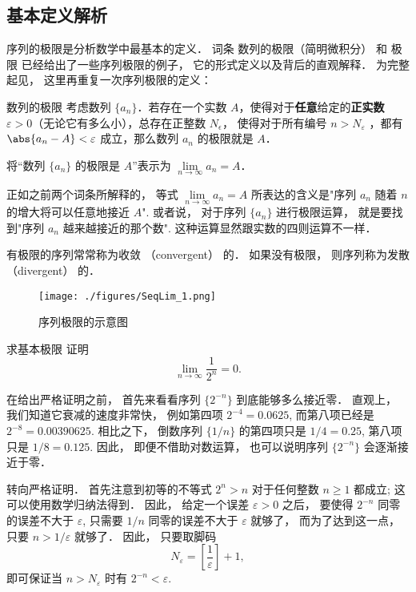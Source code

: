 

\subsection{基本定义解析}

序列的极限是分析数学中最基本的定义． 词条 数列的极限（简明微积分） 和 极限 已经给出了一些序列极限的例子， 它的形式定义以及背后的直观解释． 为完整起见， 这里再重复一次序列极限的定义：

\begin{definition}{数列的极限}
考虑数列 $\{a_n\}$．若存在一个实数 $A$，使得对于\textbf{任意}给定的\textbf{正实数} $\varepsilon > 0$（无论它有多么小），总存在正整数 $N_\epsilon$， 使得对于所有编号 $n>N_\varepsilon$ ，都有 $\abs{a_n - A} < \varepsilon$ 成立，那么数列 $a_n$ 的极限就是 $A$．

将“数列 $\{a_n\}$ 的极限是 $A$”表示为 $\lim\limits_{n\to\infty}a_n=A$．
\end{definition}

正如之前两个词条所解释的， 等式 $\lim\limits_{n\to\infty}a_n=A$ 所表达的含义是"序列 $a_n$ 随着 $n$ 的增大将可以任意地接近 $A$". 或者说， 对于序列 $\{a_n\}$ 进行极限运算， 就是要找到"序列 $a_n$ 越来越接近的那个数". 这种运算显然跟实数的四则运算不一样．

有极限的序列常常称为收敛 （convergent） 的． 如果没有极限， 则序列称为发散 （divergent） 的．
\begin{figure}[ht]
\centering
\texttt{[image: ./figures/SeqLim\_1.png]}
\caption{序列极限的示意图} \label{SeqLim_fig1}
\end{figure}
\begin{example}{求基本极限}
证明$$\lim\limits_{n\to\infty}\frac{1}{2^n}=0.$$

在给出严格证明之前， 首先来看看序列 $\{2^{-n}\}$ 到底能够多么接近零． 直观上， 我们知道它衰减的速度非常快， 例如第四项 $2^{-4}=0.0625$, 而第八项已经是 $2^{-8}=0.00390625$. 相比之下， 倒数序列 $\{1/n\}$ 的第四项只是 $1/4=0.25$, 第八项只是 $1/8=0.125$. 因此， 即便不借助对数运算， 也可以说明序列 $\{2^{-n}\}$ 会逐渐接近于零．

转向严格证明． 首先注意到初等的不等式 $2^n>n$ 对于任何整数 $n\geq1$ 都成立; 这可以使用数学归纳法得到． 因此， 给定一个误差 $\varepsilon>0$ 之后， 要使得 $2^{-n}$ 同零的误差不大于 $\varepsilon$, 只需要 $1/n$ 同零的误差不大于 $\varepsilon$ 就够了， 而为了达到这一点， 只要 $n>1/\varepsilon$ 就够了． 因此， 只要取脚码
$$
N_\varepsilon=\left[\frac{1}{\varepsilon}\right]+1,
$$
即可保证当 $n>N_\varepsilon$ 时有 $2^{-n}<\varepsilon$.
\end{example}

